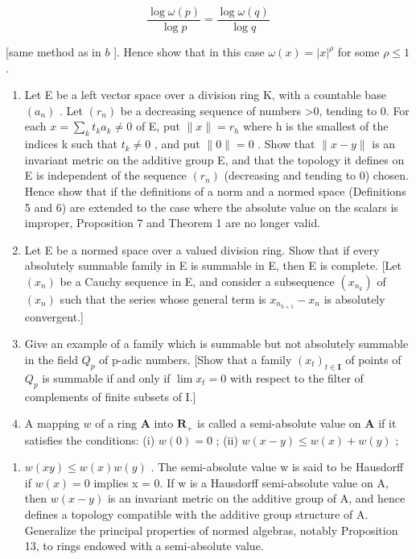 \[
\frac {\log \omega (p)}{\log p} = \frac {\log \omega (q)}{\log q}
\]

{[}same method as in \(b\) {]}. Hence show that in this case \(\omega(x) = |x|^{\rho}\) for some \(\rho \leqslant 1\) .

\begin{enumerate}
\def\labelenumi{\arabic{enumi})}
\setcounter{enumi}{5}
\item
  Let E be a left vector space over a division ring K, with a countable base \((a_{n})\) . Let \((r_{n})\) be a decreasing sequence of numbers \textgreater0, tending to 0. For each \(x = \sum_{k} t_{k} a_{k} \neq 0\) of E, put \(\|x\| = r_{h}\) where h is the smallest of the indices k such that \(t_{k} \neq 0\) , and put \(\|0\| = 0\) . Show that \(\|x - y\|\) is an invariant metric on the additive group E, and that the topology it defines on E is independent of the sequence \((r_{n})\) (decreasing and tending to 0) chosen. Hence show that if the definitions of a norm and a normed space (Definitions 5 and 6) are extended to the case where the absolute value on the scalars is improper, Proposition 7 and Theorem 1 are no longer valid.
\item
  Let E be a normed space over a valued division ring. Show that if every absolutely summable family in E is summable in E, then E is complete. {[}Let \((x_{n})\) be a Cauchy sequence in E, and consider a subsequence \((x_{n_{k}})\) of \((x_{n})\) such that the series whose general term is \(x_{n_{k+1}} - x_{n}\) is absolutely convergent.{]}
\item
  Give an example of a family which is summable but not absolutely summable in the field \(Q_{p}\) of p-adic numbers. {[}Show that a family \((x_{t})_{t\in\mathbf{I}}\) of points of \(Q_{p}\) is summable if and only if \(\lim x_{t}=0\) with respect to the filter of complements of finite subsets of I.{]}
\item
  A mapping \(w\) of a ring \(\mathbf{A}\) into \(\mathbf{R}_+\) is called a semi-absolute value on \(\mathbf{A}\) if it satisfies the conditions: (i) \(w(\mathrm{0}) = \mathrm{0}\) ; (ii) \(w(x - y) \leqslant w(x) + w(y)\) ;
\end{enumerate}

\begin{enumerate}
\def\labelenumi{(\roman{enumi})}
\setcounter{enumi}{2}
\tightlist
\item
  \(w(xy) \leqslant w(x)w(y)\) . The semi-absolute value w is said to be Hausdorff if \(w(x) = 0\) implies x = 0. If w is a Hausdorff semi-absolute value on A, then \(w(x - y)\) is an invariant metric on the additive group of A, and hence defines a topology compatible with the additive group structure of A. Generalize the principal properties of normed algebras, notably Proposition 13, to rings endowed with a semi-absolute value.
\end{enumerate}

